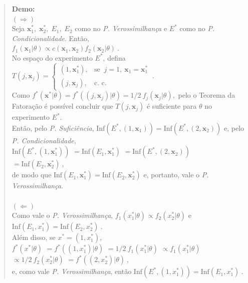 \documentclass[
]{book}
\begin{document}
\begin{quote}
\textbf{Demo:}\\
\((\boldsymbol{\Longrightarrow})\)\\
Seja \(\boldsymbol x_1^*,\;\boldsymbol x_2^*,\;E_1,\;E_2\) como no \emph{P. Verossimilhança} e \(E^*\) como no \emph{P. Condicionalidade}. Então,\\
\(f_1(\boldsymbol x_1|\theta)\propto c(\boldsymbol x_1,\boldsymbol x_2)f_2(\boldsymbol x_2|\theta)~.\)\\
No espaço do experimento \(E^*\), defina \(T(j,\boldsymbol{x}_j)=\left\{\begin{array}{ll}(1,\boldsymbol{x}_1^*), & \text{se } ~j=1,~\boldsymbol{x}_1=\boldsymbol{x}_1^*\\ (j,\boldsymbol{x}_j), & \text{c. c.} \end{array}\right.~.\)\\
Como \(f^*(\boldsymbol x^*|\theta)=f^*\left((j,\boldsymbol x_j)|\theta\right)=1/2~f_j(\boldsymbol x_j|\theta),\) pelo o Teorema da Fatoração é possível concluir que \(T(j,\boldsymbol x_j)\) é suficiente para \(\theta\) no experimento \(E^*\).\\
Então, pelo \emph{P. Suficiência}, \(\text{Inf}\left(E^*,(1,\boldsymbol x_1)\right)=\text{Inf}\left(E^*,(2,\boldsymbol x_2)\right)\) e, pelo \emph{P. Condicionalidade},\\
\(\text{Inf}\left(E^*,(1,\boldsymbol x_1^*)\right)\) \(=\text{Inf}\left(E_1,\boldsymbol x_1^*\right)\) \(=\text{Inf}\left(E^*,(2,\boldsymbol x_2)\right)\) \(=\text{Inf}\left(E_2,\boldsymbol x_2^*\right)~,\)\\
de modo que \(\text{Inf}\left(E_1,\boldsymbol x_1^*\right)=\text{Inf}\left(E_2,\boldsymbol x_2^*\right)\) e, portanto, vale o \emph{P. Verossimilhança}.\\
\(~\)\\
\((\boldsymbol{\Longleftarrow})\)\\
Como vale o \emph{P. Verossimilhança}, \(f_1(x_1^*|\theta)\propto f_2(x_2^*|\theta)\) e \(\text{Inf}(E_1,x_1^*)=\text{Inf}(E_2,x_2^*)~.\)\\
Além disso, se \(x^*=(1,x_1^*)\),\\
\(f^*(x^*|\theta)\) \(=f^*\left((1,x_1^*)|\theta\right)\) \(=1/2~f_1(x_1^*|\theta)\) \(\propto f_1(x_1^*|\theta)\) \(\propto 1/2~f_2(x_2^*|\theta)\) \(=f^*\left((2,x_2^*)|\theta\right)~,\)\\
e, como vale \emph{P. Verossimilhança}, então \(\text{Inf}\left(E^*,(1,x_1^*)\right)=\text{Inf}(E_1,x_1^*)~.\)\\

\end{quote}
\end{document}

